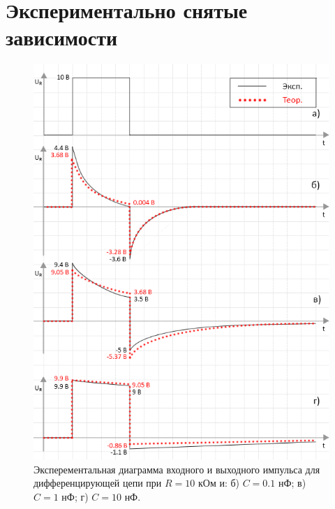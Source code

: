 \section{Экспериментально снятые зависимости}

\begin{figure}[H]
	\begin{center}
		\includegraphics[width=14cm]{img/diff_with_theory}
		\caption{Эксперементальная диаграмма входного и выходного импульса для дифференцирующей цепи при $R = 10$ кОм и: б) $C = 0.1$ нФ; в) $C = 1$ нФ; г) $C = 10$ нФ.} 
		\label{t:1} %
	\end{center}
\end{figure}

